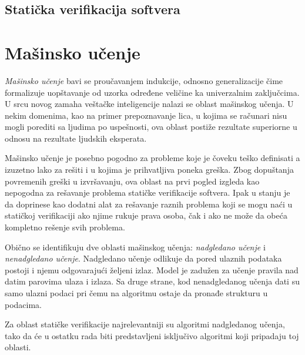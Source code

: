\documentclass[a4paper]{article}
\begin{document}
\subsection{Statička verifikacija softvera}
\label{subsec:staticka}



\section{Mašinsko učenje}



\textit{Mašinsko učenje} bavi se proučavanjem indukcije, odnosno generalizacije 
čime formalizuje uopštavanje od uzorka određene veličine ka univerzalnim zaključcima. 
U srcu novog zamaha veštačke inteligencije nalazi se oblast mašinskog učenja. 
U nekim domenima, kao na primer prepoznavanje lica, u kojima se računari nisu 
mogli porediti sa ljudima po uspešnosti, ova oblast postiže rezultate superiorne 
u odnosu na rezultate ljudskih eksperata.


Mašinsko učenje je posebno pogodno za probleme koje je čoveku teško definisati a 
izuzetno lako za rešiti i u kojima je prihvatljiva poneka greška. Zbog dopuštanja 
povremenih greški u izvršavanju, ova oblast na prvi pogled izgleda kao nepogodna 
za rešavanje problema statičke verifikacije softvera. Ipak u stanju je da doprinese 
kao dodatni alat za rešavanje raznih problema koji se mogu naći u statičkoj 
verifikaciji ako njime rukuje prava osoba, čak i ako ne može da obeća kompletno 
rešenje svih problema.

Obično se identifikuju dve oblasti mašinskog učenja: \textit{nadgledano učenje} i 
\textit{nenadgledano učenje}. Nadgledano učenje odlikuje da pored ulaznih podataka 
postoji i njemu odgovarajući željeni izlaz. Model je zadužen za učenje pravila nad 
datim parovima ulaza i izlaza. Sa druge strane, kod nenadgledanog učenja dati su 
samo ulazni podaci pri čemu na algoritmu ostaje da pronađe strukturu u podacima. 

Za oblast statičke verifikacije najrelevantniji su algoritmi nadgledanog učenja, 
tako da će u ostatku rada biti predstavljeni isključivo algoritmi koji pripadaju toj oblasti.
\end{document}
